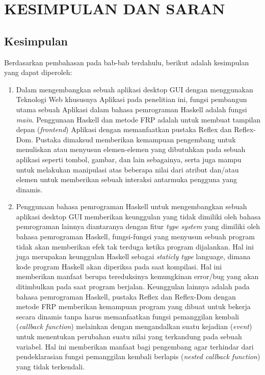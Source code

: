 \documentclass[pi.tex]{subfile}
\begin{document}
\chapter{KESIMPULAN DAN SARAN}

\section{Kesimpulan}

Berdasarkan pembahasan pada bab-bab terdahulu, berikut adalah kesimpulan yang dapat diperoleh:
\begin{enumerate}[leftmargin=1.25cm]
\item Dalam mengembangkan sebuah aplikasi desktop GUI dengan menggunakan Teknologi Web khususnya Aplikasi pada penelitian ini, fungsi pembangun utama sebuah Aplikasi dalam bahasa pemrograman Haskell adalah fungsi \emph{main}. Penggunaan Haskell dan metode FRP adalah untuk membuat tampilan depan (\emph{frontend}) Aplikasi dengan memanfaatkan pustaka Reflex dan Reflex-Dom. Pustaka dimaksud memberikan kemampuan pengembang untuk menuliskan atau menyusun elemen-elemen yang dibutuhkan pada sebuah aplikasi seperti tombol, gambar, dan lain sebagainya, serta juga mampu untuk melakukan manipulasi atas beberapa nilai dari atribut dan/atau elemen untuk memberikan sebuah interaksi antarmuka pengguna yang dinamis.
\item Penggunaan bahasa pemrograman Haskell untuk mengembangkan sebuah aplikasi desktop GUI memberikan keunggulan yang tidak dimiliki oleh bahasa pemrograman lainnya diantaranya dengan fitur \emph{type system} yang dimiliki oleh bahasa pemrograman Haskell, fungsi-fungsi yang menyusun sebuah program tidak akan memberikan efek tak terduga ketika program dijalankan. Hal ini juga merupakan keunggulan Haskell sebagai \emph{staticly type} language, dimana kode program Haskell akan diperiksa pada saat kompilasi. Hal ini memberikan manfaat  berupa tereduksinya kemungkinan error/bug yang akan ditimbulkan pada saat program berjalan. Keunggulan lainnya adalah pada bahasa pemrograman Haskell, pustaka Reflex dan Reflex-Dom dengan metode FRP memberikan kemampuan program yang dibuat untuk bekerja secara dinamis tanpa harus memanfaatkan fungsi pemanggilan kembali (\emph{callback function}) melainkan dengan mengandalkan suatu kejadian (\emph{event}) untuk menentukan perubahan suatu nilai yang terkandung pada sebuah variabel. Hal ini memberikan manfaat bagi pengembang agar terhindar dari pendeklarasian fungsi pemanggilan kembali  berlapis (\emph{nested callback function}) yang tidak terkendali.
  
\end{enumerate}
\end{document}
